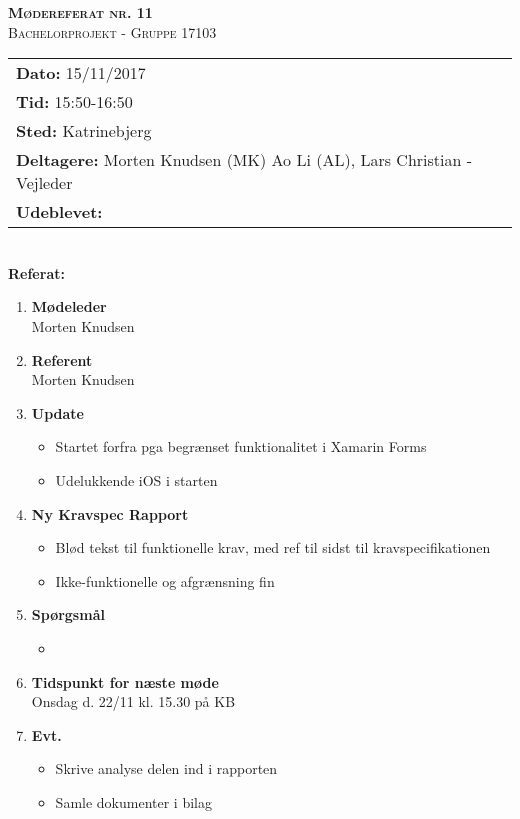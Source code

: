 
\newcommand{\HRule}{\rule{\linewidth}{0.1mm}}


	\begin{center}
		{\huge \bfseries \textsc{Mødereferat nr. 11}}\\
		\textsc{\large Bachelorprojekt - Gruppe 17103}\\[0.3cm]
	\end{center}
	\begin{tabular}{ll}
	\large \textbf{Dato:} 15/11/2017  	\\ %
	\large \textbf{Tid:}  15:50-16:50 	\\ %
	\large \textbf{Sted:} Katrinebjerg		\\ %
	\large \textbf{Deltagere:} Morten Knudsen (MK) Ao Li (AL), Lars Christian - Vejleder \\
	\large \textbf{Udeblevet:} 
	\end{tabular}\\
	\phantom{\,}\hspace{0.1em} \large \textbf{Referat:}
	\begin{enumerate}
		\itemsep 0.3em 
		\item \textbf{Mødeleder}\\
			Morten Knudsen
		\item \textbf{Referent}\\
			Morten Knudsen

		\item \textbf{Update}
			\begin{itemize}[-]
				\item Startet forfra pga begrænset funktionalitet i Xamarin Forms
				\item Udelukkende iOS i starten
				
			\end{itemize}
	
		\item \textbf{Ny Kravspec Rapport}
		\begin{itemize}[-]
			\item Blød tekst til funktionelle krav, med ref til sidst til kravspecifikationen
			\item Ikke-funktionelle og afgrænsning fin
			
		\end{itemize}
		
		\item \textbf{Spørgsmål}
			\begin{itemize}[-]
				\item
				
			\end{itemize}
	
		\item \textbf{Tidspunkt for næste møde} \\
			Onsdag d. 22/11 kl. 15.30 på KB
			
		\item \textbf{Evt.}
			\begin{itemize}[-]
				\item Skrive analyse delen ind i rapporten
				\item Samle dokumenter i bilag
			\end{itemize}
			
	\end{enumerate}

